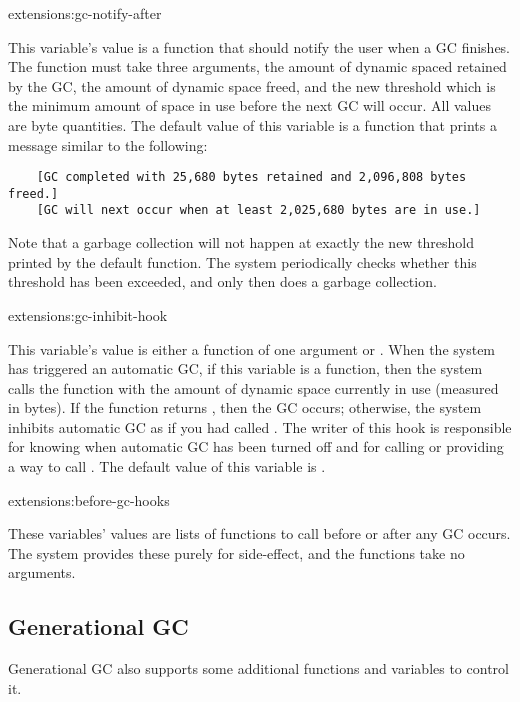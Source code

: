 \begin{defvar}{extensions:}{gc-notify-after}
  
  This variable's value is a function that should notify the user when
  a GC finishes.  The function must take three arguments, the amount
  of dynamic spaced retained by the GC, the amount of dynamic space
  freed, and the new threshold which is the minimum amount of space in
  use before the next GC will occur.  All values are byte quantities.
  The default value of this variable is a function that prints a
  message similar to the following:
  \begin{verbatim}
    [GC completed with 25,680 bytes retained and 2,096,808 bytes freed.]
    [GC will next occur when at least 2,025,680 bytes are in use.]
  \end{verbatim}
\end{defvar}

Note that a garbage collection will not happen at exactly the new
threshold printed by the default 
function.  The system periodically checks whether this threshold has
been exceeded, and only then does a garbage collection.

\begin{defvar}{extensions:}{gc-inhibit-hook}
  
  This variable's value is either a function of one argument or \nil.
  When the system has triggered an automatic GC, if this variable is a
  function, then the system calls the function with the amount of
  dynamic space currently in use (measured in bytes).  If the function
  returns \nil, then the GC occurs; otherwise, the system inhibits
  automatic GC as if you had called .  The writer of
  this hook is responsible for knowing when automatic GC has been
  turned off and for calling or providing a way to call
  .  The default value of this variable is \nil.
\end{defvar}

\begin{defvar}{extensions:}{before-gc-hooks}
  
  These variables' values are lists of functions to call before or
  after any GC occurs.  The system provides these purely for
  side-effect, and the functions take no arguments.
\end{defvar}

\subsection{Generational GC}
Generational GC also supports some additional functions and variables
to control it.

